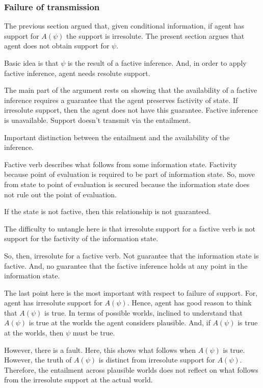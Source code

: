 \documentclass[10pt]{article}
\begin{document}
\subsubsection{Failure of transmission}
\label{sec:failure-transmission}

\begin{note}[Continuing]
  The previous section argued that, given conditional information, if agent has support for \(A(\psi)\) the support is irresolute.
  The present section argues that agent does not obtain support for \(\psi\).

  Basic idea is that \(\psi\) is the result of a factive inference.
  And, in order to apply factive inference, agent needs resolute support.

  The main part of the argument rests on showing that the availability of a factive inference requires a guarantee that the agent preserves factivity of state.
  If irresolute support, then the agent does not have this guarantee.
  Factive inference is unavailable.
  Support doesn't transmit via the entailment.

  Important distinction between the entailment and the availability of the inference.

  Factive verb describes what follows from some information state.
  Factivity because point of evaluation is required to be part of information state.
  So, move from state to point of evaluation is secured because the information state does not rule out the point of evaluation.

  If the state is not factive, then this relationship is not guaranteed.

  The difficulty to untangle here is that irresolute support for a factive verb is not support for the factivity of the information state.

  So, then, irresolute for a factive verb.
  Not guarantee that the information state is factive.
  And, no guarantee that the factive inference holds at any point in the information state.

  The last point here is the most important with respect to failure of support.
  For, agent has irresolute support for \(A(\psi)\).
  Hence, agent has good reason to think that \(A(\psi)\) is true.
  In terms of possible worlds, inclined to understand that \(A(\psi)\) is true at the worlds the agent considers plausible.
  And, if \(A(\psi)\) is true at the worlds, then \(\psi\) must be true.

  However, there is a fault.
  Here, this shows what follows when \(A(\psi)\) is true.
  However, the truth of \(A(\psi)\) is distinct from irresolute support for \(A(\psi)\).
  Therefore, the entailment across plausible worlds does not reflect on what follows from the irresolute support at the actual world.


\end{note}
\end{document}
